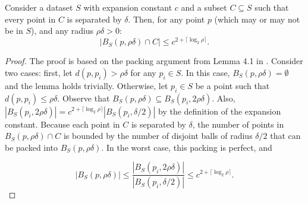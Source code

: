 \begin{lemma}
Consider a dataset $S$ with expansion constant $c$ and a subset $C \subseteq S$
such that every point in $C$ is separated by $\delta$.  Then, for any point
$p$ (which may or may not be in $S$), and any radius $\rho \delta > 0$:
\begin{equation}
| B_S(p, \rho \delta) \cap C | \le c^{2 + \lceil \log_2 \rho \rceil}.
\end{equation}
\label{lem:packing}
\end{lemma}

\begin{proof}
The proof is based on the packing argument from Lemma 4.1 in
\cite{langford2006}. Consider two cases: first, let $d(p, p_i) > \rho \delta$
for any $p_i \in S$. In this case, $B_S(p, \rho \delta) = \emptyset$ and the
lemma holds trivially.
Otherwise, let $p_i \in S$ be a point such that $d(p, p_i) \leq \rho \delta$.
Observe that $B_S(p, \rho \delta) \subseteq B_S(p_i, 2 \rho \delta)$.
Also, $| B_S(p_i, 2 \rho \delta) | = c^{2 + \lceil \log_2 \rho
\rceil} | B_S(p_i, \delta / 2) |$ by the definition of the expansion constant.
Because each point in $C$ is separated by $\delta$, the
number of points in $B_S(p, \rho \delta) \cap C$ is
bounded by the number of disjoint balls of radius $\delta / 2$ that can be
packed into $B_S(p, \rho \delta)$.  In the worst case, this packing is
perfect, and

\begin{equation}
|B_S(p, \rho \delta)| \le \frac{|B_S(p_i, 2 \rho \delta)|}{|B_S(p_i, \delta
/ 2)|} \le c^{2 + \lceil \log_2 \rho \rceil}.
\end{equation}
\end{proof}
